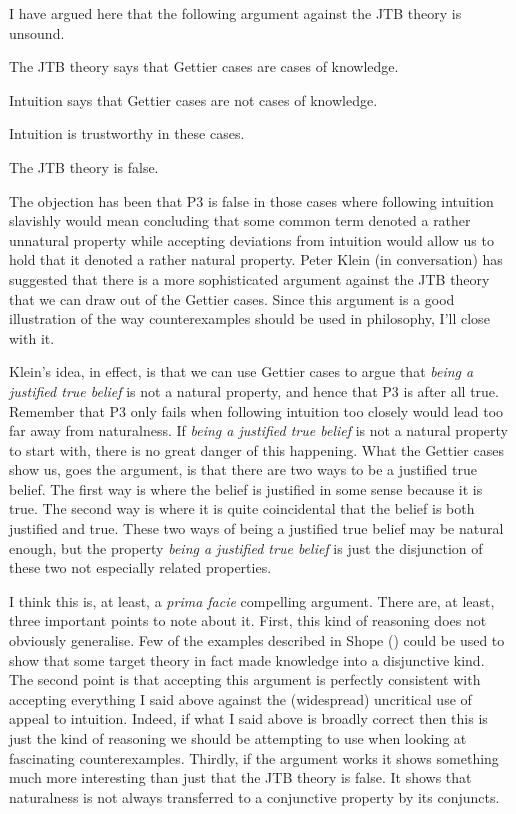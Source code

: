 \documentclass[
  10pt,
  letterpaper,
  DIV=11,
  numbers=noendperiod,
  twoside]{scrartcl}
\providecommand{\tightlist}{%
  \setlength{\itemsep}{0pt}\setlength{\parskip}{0pt}}\usepackage{longtable,booktabs,array}
\begin{document}
I have argued here that the following argument against the JTB theory is
unsound.

\begin{description}
\tightlist
\item[P1.]
The JTB theory says that Gettier cases are cases of knowledge.
\item[P2.]
Intuition says that Gettier cases are not cases of knowledge.
\item[P3.]
Intuition is trustworthy in these cases.
\item[C.]
The JTB theory is false.
\end{description}

The objection has been that P3 is false in those cases where following
intuition slavishly would mean concluding that some common term denoted
a rather unnatural property while accepting deviations from intuition
would allow us to hold that it denoted a rather natural property. Peter
Klein (in conversation) has suggested that there is a more sophisticated
argument against the JTB theory that we can draw out of the Gettier
cases. Since this argument is a good illustration of the way
counterexamples should be used in philosophy, I'll close with it.

Klein's idea, in effect, is that we can use Gettier cases to argue that
\emph{being a justified true belief} is not a natural property, and
hence that P3 is after all true. Remember that P3 only fails when
following intuition too closely would lead too far away from
naturalness. If \emph{being a justified true belief} is not a natural
property to start with, there is no great danger of this happening. What
the Gettier cases show us, goes the argument, is that there are two ways
to be a justified true belief. The first way is where the belief is
justified in some sense because it is true. The second way is where it
is quite coincidental that the belief is both justified and true. These
two ways of being a justified true belief may be natural enough, but the
property \emph{being a justified true belief} is just the disjunction of
these two not especially related properties.

I think this is, at least, a \emph{prima facie} compelling argument.
There are, at least, three important points to note about it. First,
this kind of reasoning does not obviously generalise. Few of the
examples described in Shope () could be
used to show that some target theory in fact made knowledge into a
disjunctive kind. The second point is that accepting this argument is
perfectly consistent with accepting everything I said above against the
(widespread) uncritical use of appeal to intuition. Indeed, if what I
said above is broadly correct then this is just the kind of reasoning we
should be attempting to use when looking at fascinating counterexamples.
Thirdly, if the argument works it shows something much more interesting
than just that the JTB theory is false. It shows that naturalness is not
always transferred to a conjunctive property by its conjuncts.
\end{document}
